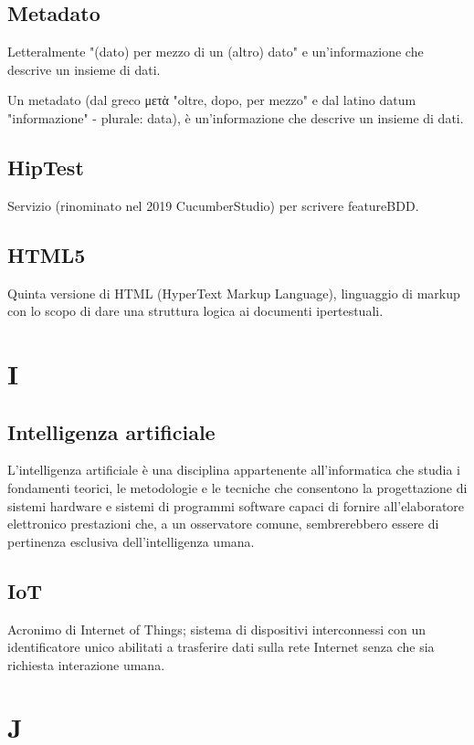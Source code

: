 \subsection*{Metadato}
Letteralmente "(dato) per mezzo di un (altro) dato" e un'informazione che descrive un insieme di dati. 

Un metadato (dal greco μετὰ "oltre, dopo, per mezzo" e dal latino datum "informazione" - plurale: data), è un'informazione che descrive un insieme di dati. 

\subsection*{HipTest}
Servizio (rinominato nel 2019 CucumberStudio) per scrivere feature\glosp BDD\glo.

\subsection*{HTML5}
Quinta versione di HTML (HyperText Markup Language), linguaggio di markup con lo scopo di dare una struttura logica ai  documenti ipertestuali.

\section*{I}
\subsection*{Intelligenza artificiale}
L'intelligenza artificiale è una disciplina appartenente all'informatica che studia i fondamenti teorici, le metodologie e le tecniche che consentono la progettazione di sistemi hardware e sistemi di programmi software capaci di fornire all'elaboratore elettronico prestazioni che, a un osservatore comune, sembrerebbero essere di pertinenza esclusiva dell'intelligenza umana.

\subsection*{IoT}
Acronimo di Internet of Things; sistema di dispositivi interconnessi con un identificatore unico abilitati a trasferire dati sulla rete Internet senza che sia richiesta interazione umana.

\section*{J}

